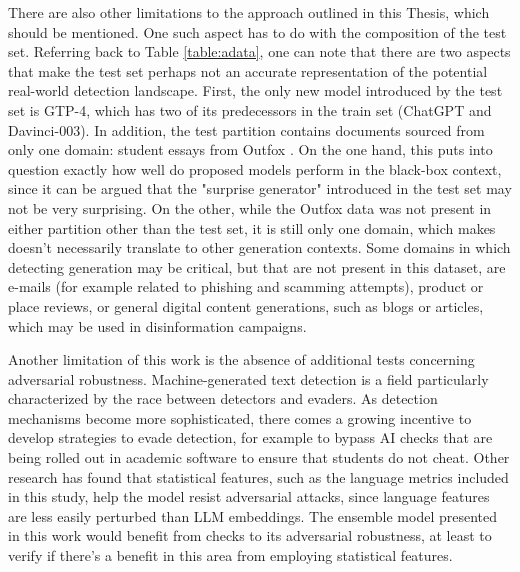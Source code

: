 There are also other limitations to the approach outlined in this Thesis, which should be mentioned.
One such aspect has to do with the composition of the test set.
Referring back to Table \ref{table:adata}, one can note that there are two aspects that make the test set perhaps not an accurate representation of the potential real-world detection landscape.
First, the only new model introduced by the test set is GTP-4, which has two of its predecessors in the train set (ChatGPT and Davinci-003).
In addition, the test partition contains documents sourced from only one domain: student essays from Outfox \citep{koike2024outfox}.
On the one hand, this puts into question exactly how well do proposed models perform in the black-box context, since it can be argued that the "surprise generator" introduced in the test set may not be very surprising.
On the other, while the Outfox data was not present in either partition other than the test set, it is still only one domain, which makes doesn't necessarily translate to other generation contexts.
Some domains in which detecting generation may be critical, but that are not present in this dataset, are e-mails (for example related to phishing and scamming attempts), product or place reviews, or general digital content generations, such as blogs or articles, which may be used in disinformation campaigns.

Another limitation of this work is the absence of additional tests concerning adversarial robustness.
Machine-generated text detection is a field particularly characterized by the race between detectors and evaders.
As detection mechanisms become more sophisticated, there comes a growing incentive to develop strategies to evade detection, for example to bypass AI checks that are being rolled out in academic software to ensure that students do not cheat.
Other research \citep{Crothers_2022} has found that statistical features, such as the language metrics included in this study, help the model resist adversarial attacks, since language features are less easily perturbed than LLM embeddings.
The ensemble model presented in this work would benefit from checks to its adversarial robustness, at least to verify if there's a benefit in this area from employing statistical features.


